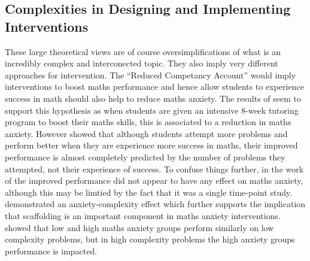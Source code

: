 \documentclass[14pt]{memoir}
\begin{document}
\subsection*{Complexities in Designing and Implementing Interventions}

These large theoretical views are of course oversimplifications of what is an incredibly complex and interconected topic. They also imply very different approaches for intervention. The ``Reduced Competancy Account'' would imply interventions to boost maths performance and hence allow students to experience success in math should also help to reduce maths anxiety. The results of   seem to support this hypothesis as when students are given an intensive 8-week tutoring program to boost their maths skills, this is associated to a reduction in maths anxiety. However  showed that although students attempt more problems and perform better when they are experience more success in maths, their improved performance is almost completely predicted by the number of problems they attempted, not their experience of success. To confuse things further, in the work of  the improved performance did not appear to have any effect on maths anxiety, although this may be limtied by the fact that it was a single time-point study.  demonstrated an anxiety-complexity effect which further supports the implication that scaffolding is an important component in maths anxiety interventions.  showed that low and high maths anxiety groups perform similarly on low complexity problems, but in high complexity problems the high anxiety groups performance is impacted.
	
\end{document}
